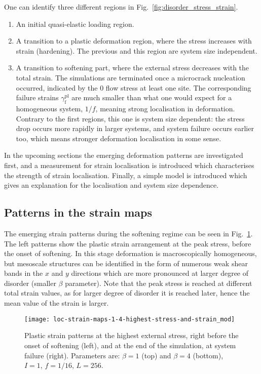 One can identify three different regions in Fig.~\ref{fig:disorder_stress_strain}.
\begin{enumerate}
\item An initial quasi-elastic loading region.
\item A transition to a plastic deformation region, where the stress increases with strain (hardening). The previous and this region are system size independent.
\item A transition to softening part, where the external stress decreases with the total strain. The simulations are terminated once a microcrack nucleation occurred, indicated by the $0$ flow stress at least one site. The corresponding failure strains $\gamma _{\text{f}}^{{\text{pl}}}$ are much smaller than what one would expect for a homogeneous system, $1/f$, meaning strong localisation in deformation. Contrary to the first regions, this one is system size dependent: the stress drop occurs more rapidly in larger systems, and system failure occurs earlier too, which means stronger deformation localisation in some sense. 
\end{enumerate}

In the upcoming sections the emerging deformation patterns are investigated first, and a measurement for strain localisation is introduced which characterises the strength of strain localisation. Finally, a simple model is introduced which gives an explanation for the localisation and system size dependence.

\subsection{Patterns in the strain maps}
The emerging strain patterns during the softening regime can be seen in Fig.~\ref{fig:disorder_strain_maps}. The left patterns show the plastic strain arrangement at the peak stress, before the onset of softening. In this stage deformation is macroscopically homogeneous, but mesoscale structures can be identified in the form of numerous weak shear bands in the $x$ and $y$ directions which are more pronounced at larger degree of disorder (smaller $\beta$ parameter). Note that the peak stress is reached at different total strain values, as for larger degree of disorder it is reached later, hence the mean value of the strain is larger.


\begin{figure}[htbp!] 
\centering    
\texttt{[image: loc-strain-maps-1-4-highest-stress-and-strain\_mod]}
\caption[Strain patterns at peak stress and at failure]{Plastic strain patterns at the highest external stress, right before the onset of softening (left), and at the end of the simulation, at system failure (right). Parameters are: $\beta=1$ (top) and $\beta=4$ (bottom), $I=1$, $f=1/16$, $L=256$.}
\label{fig:disorder_strain_maps}
\end{figure}

